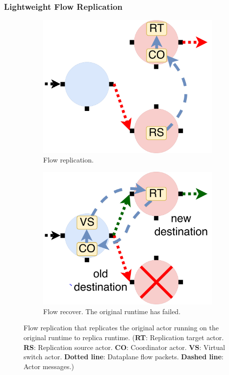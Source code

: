 \subsubsection{Lightweight Flow Replication}

\begin{figure}[!h]
\begin{subfigure}[t]{0.49\linewidth}
   \centering
   \includegraphics[width=0.66\columnwidth]{figure/nfactor-replication.pdf}
   \caption{Flow replication.}\label{fig:rep}
  \end{subfigure}
  \begin{subfigure}[t]{0.49\linewidth}
     \centering
     \includegraphics[width=0.66\columnwidth]{figure/nfactor-recover.pdf}
     \caption{Flow recover. The original runtime has failed.}\label{fig:recover}
    \end{subfigure}
 \caption{Flow replication that replicates the original actor running on the original runtime to replica runtime. (\textbf{RT}: Replication target actor. \textbf{RS}: Replication source actor. \textbf{CO}: Coordinator actor. \textbf{VS}: Virtual switch actor. \textbf{Dotted line}: Dataplane flow packets. \textbf{Dashed line}: Actor messages.)}
\label{fig:flow-rep}
\end{figure}

